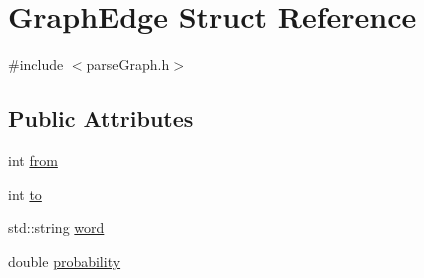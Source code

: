 \hypertarget{struct_graph_edge}{\section{Graph\+Edge Struct Reference}
\label{struct_graph_edge}
}


{\ttfamily \#include $<$parse\+Graph.\+h$>$}

\subsection*{Public Attributes}
\begin{DoxyCompactItemize}
\item 
int \hyperlink{struct_graph_edge_ad8b9f222e49fe17fe381f347ff7c7e81}{from}
\item 
int \hyperlink{struct_graph_edge_ad8e53c4ee2f5b3f45de08651dc4ce165}{to}
\item 
std\+::string \hyperlink{struct_graph_edge_aea90e7ccd4ee11650f02385ed63268f9}{word}
\item 
double \hyperlink{struct_graph_edge_a56e516acce66767c94701a0c584b7100}{probability}
\end{DoxyCompactItemize}


